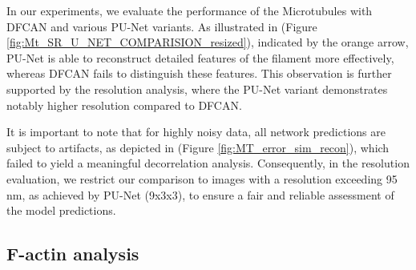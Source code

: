 \documentclass[11pt,
  paper=a4, 
  bibliography=totocnumbered,
	captions=tableheading,
	BCOR=10mm
]{scrreprt}
\theoremstyle{definition}
\newcommand{\figref}[1]{(Figure \ref{#1})}
\newcommand{\figureref}[1]{Figure \ref{#1}}
\begin{document}


In our experiments, we evaluate the performance of the Microtubules with DFCAN and various PU-Net variants. 
As illustrated in \figref{fig:Mt_SR_U_NET_COMPARISION_resized}, indicated by the orange arrow, PU-Net is able to reconstruct detailed 
features of the filament more effectively, whereas DFCAN fails to distinguish these features. This observation is further supported by the resolution 
analysis, where the PU-Net variant demonstrates notably higher resolution compared to DFCAN.

\vspace{1cm}
\noindent 
It is important to note that for highly noisy data, all network predictions are subject to artifacts, as depicted in \figref{fig:MT_error_sim_recon}, 
which failed to yield a meaningful decorrelation analysis. Consequently, in the resolution evaluation, we restrict our comparison to images with a resolution 
exceeding 95 nm, as achieved by PU-Net (9x3x3), to ensure a fair and reliable assessment of the model predictions.



\subsection{F-actin analysis}

\end{document}
